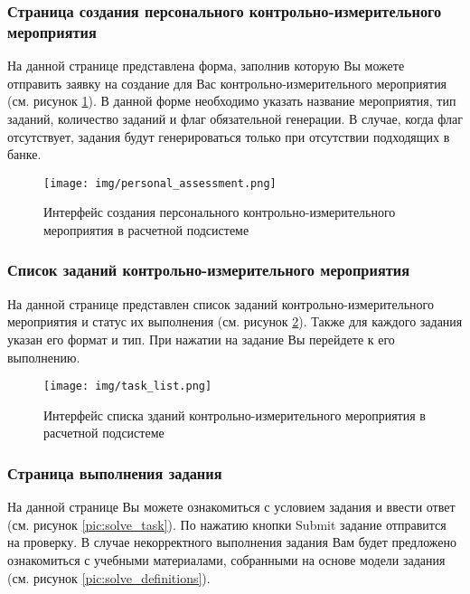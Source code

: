 \documentclass[a4paper,12pt,reqno]{article}
\begin{document}
    \subsubsection{Страница создания персонального контрольно-измерительного мероприятия}
    На данной странице представлена форма, заполнив которую Вы можете отправить заявку на создание для Вас контрольно-измерительного мероприятия (см. рисунок \ref{pic:personal_assessment}). В данной форме необходимо указать название мероприятия, тип заданий, количество заданий и флаг обязательной генерации. В случае, когда флаг отсутствует, задания будут генерироваться только при отсутствии подходящих в банке.

    \begin{figure}[H]
        \centering
        \texttt{[image: img/personal\_assessment.png]}
        \caption{Интерфейс создания персонального контрольно-измерительного мероприятия в расчетной подсистеме}
        \label{pic:personal_assessment}
    \end{figure}

    \subsubsection{Список заданий контрольно-измерительного мероприятия}

    На данной странице представлен список заданий контрольно-измерительного мероприятия и статус их выполнения (см. рисунок \ref{pic:task_list}). Также для каждого задания указан его формат и тип. При нажатии на задание Вы перейдете к его выполнению.

    \begin{figure}[H]
        \centering
        \texttt{[image: img/task\_list.png]}
        \caption{Интерфейс списка зданий контрольно-измерительного мероприятия в расчетной подсистеме}
        \label{pic:task_list}
    \end{figure}

    \subsubsection{Страница выполнения задания}
    На данной странице Вы можете ознакомиться с условием задания и ввести ответ (см. рисунок \ref{pic:solve_task}). По нажатию кнопки Submit задание отправится на проверку. В случае некорректного выполнения задания Вам будет предложено ознакомиться с учебными материалами, собранными на основе модели задания (см. рисунок \ref{pic:solve_definitions}).
\end{document}
